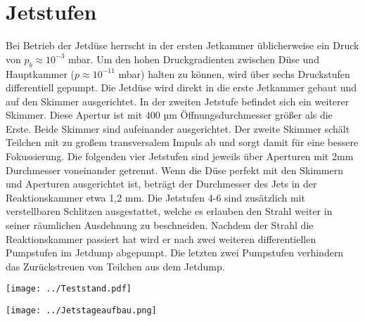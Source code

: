 \section{Jetstufen} \label{sec:Jetstufen}

Bei Betrieb der Jetdüse herrscht in der ersten Jetkammer üblicherweise ein Druck von $p_b \approx 10^{-3}$ mbar. Um den hohen Druckgradienten zwischen Düse und Hauptkammer ($p \approx 10^{-11}$ mbar) halten zu können, wird über sechs Druckstufen differentiell gepumpt. 
Die Jetdüse wird direkt in die erste Jetkammer gebaut und auf den Skimmer ausgerichtet. In der zweiten Jetstufe befindet sich ein weiterer Skimmer. Diese Apertur ist mit 400 µm Öffnungsdurchmesser größer als die Erste. Beide Skimmer sind aufeinander ausgerichtet. Der zweite Skimmer schält Teilchen mit zu großem transversalem Impuls ab und sorgt damit für eine bessere Fokussierung. Die folgenden vier Jetstufen sind jeweils über Aperturen mit 2mm Durchmesser voneinander getrennt. Wenn die Düse perfekt mit den Skimmern und Aperturen ausgerichtet ist, beträgt der Durchmesser des Jets in der Reaktionskammer etwa 1,2 mm. Die Jetstufen 4-6 sind zusätzlich mit verstellbaren Schlitzen ausgestattet, welche es erlauben den Strahl weiter in seiner räumlichen Ausdehnung zu beschneiden. Nachdem der Strahl die Reaktionskammer passiert hat wird er nach zwei weiteren differentiellen Pumpstufen im Jetdump abgepumpt. Die letzten zwei Pumpstufen verhindern das Zurückstreuen von Teilchen aus dem Jetdump.

\begin{center}
\begin{minipage}{\linewidth}
\centering
\texttt{[image: ../Teststand.pdf]}%
 \label{fig:Teststand}
\end{minipage} 
\end{center} 

\begin{center}
\begin{minipage}{\linewidth}
\centering
\texttt{[image: ../Jetstageaufbau.png]}%
 \label{fig:Jetstageaufbau}
\end{minipage} 
\end{center} 